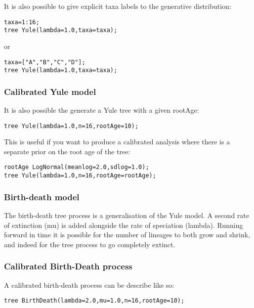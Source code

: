 \documentclass[10pt,letterpaper,table]{article}
\begin{document}
{It is also possible to give explicit taxa labels to the generative distribution:

\begin{alltt}
  taxa = 1:16;
  tree ~ Yule(lambda=1.0, taxa=taxa);
\end{alltt}

or

\begin{alltt}
  taxa = ["A", "B", "C", "D"];
  tree ~ Yule(lambda=1.0, taxa=taxa);
\end{alltt}

\subsubsection*{Calibrated Yule model}

It is also possible the generate a Yule tree with a given rootAge:

\begin{alltt}
  tree ~ Yule(lambda=1.0, n=16, rootAge=10);
\end{alltt}

This is useful if you want to produce a calibrated analysis where there is a separate prior on the root age of the tree:

\begin{alltt}
  rootAge ~ LogNormal(meanlog=2.0, sdlog=1.0);
  tree ~ Yule(lambda=1.0, n=16, rootAge=rootAge);
\end{alltt}

\subsubsection*{Birth-death model}

The birth-death tree process is a generalisation of the Yule model. A second rate of extinction (mu) is added alongside
the rate of speciation (lambda). Running forward in time it is possible for the number of lineages to both grow and
shrink, and indeed for the tree process to go completely extinct.

\subsubsection*{Calibrated Birth-Death process}

A calibrated birth-death process can be describe like so:

\begin{alltt}
  tree ~ BirthDeath(lambda=2.0, mu=1.0, n=16, rootAge=10);
\end{alltt}

}
\end{document}
